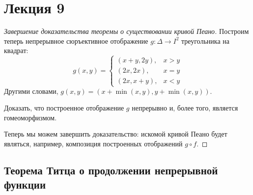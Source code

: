 \section{Лекция 9}

\begin{proof}[Завершение доказательства теоремы о существовании кривой Пеано]
    Построим теперь непрерывное сюръективное отображение $g: \Delta \rightarrow I^2$ треугольника на квадрат:
    \[
        g(x, y) =
        \begin{cases}
            (x + y, 2y), & x > y \\
            (2x, 2x), & x = y \\
            (2x, x + y), & x < y
        \end{cases}
    \]
    Другими словами, $g(x,y) = (x + \min{(x, y)}, y + \min{(x, y)})$.

    \begin{exercise}
        Доказать, что построенное отображение $g$ непрерывно и, более того, является гомеоморфизмом. 
    \end{exercise}

    Теперь мы можем завершить доказательство: искомой кривой Пеано будет являться, например, композиция построенных отображений $g \circ f$.
\end{proof}

\subsection{Теорема Титца о продолжении непрерывной функции}

